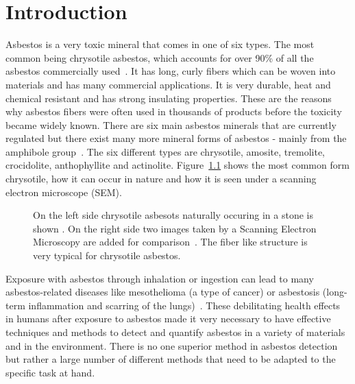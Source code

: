 \chapter{Introduction}

Asbestos is a very toxic mineral that comes in one of six types. The most common being chrysotile asbestos, which accounts for over 90\% of all the asbestos commercially used~\cite{asbestosMaacenter}. It has long, curly fibers which can be woven into materials and has many commercial applications. It is very durable, heat and chemical resistant and has strong insulating properties. These are the reasons why asbestos fibers were often used in thousands of products before the toxicity became widely known. There are six main asbestos minerals that are currently regulated but there exist many more mineral forms of asbestos - mainly from the amphibole group~\cite{environmental2008framework}. The six different types are chrysotile, amosite, tremolite, crocidolite, anthophyllite and actinolite. Figure~\ref{fig:chrysotile} shows the most common form chrysotile, how it can occur in nature and how it is seen under a scanning electron microscope (SEM).

\begin{figure}[h]
\centering
\caption{On the left side chrysotile asbesots naturally occuring in a stone is shown \cite{chrysoltileFullSizeImage}. On the right side two images taken by a Scanning Electron Microscopy are added for comparison~\cite{mohammed2015}. The fiber like structure is very typical for chrysotile asbestos.}
\label{fig:chrysotile}
\end{figure}

Exposure with asbestos through inhalation or ingestion can lead to many asbestos-related diseases like mesothelioma (a type of cancer) or asbestosis (long-term inflammation and scarring of the lungs)~\cite{asbestosMaacenter, MesotheliomaWiki, asbestosisWiki}. These debilitating health effects in humans after exposure to asbestos made it very necessary to have effective techniques and methods to detect and quantify asbestos in a variety of materials and in the environment. There is no one superior method in asbestos detection but rather a large number of different methods that need to be adapted to the specific task at hand. \\

